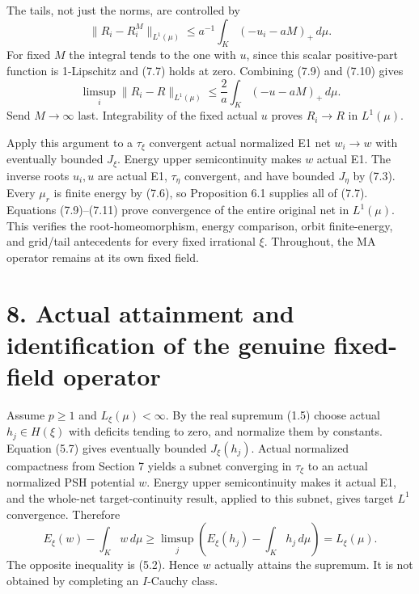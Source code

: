 \documentclass[
  10pt,
]{article}
\begin{document}
The tails, not just the norms, are controlled by \[
 \|R_i-R_i^M\|_{L^1(\mu)}
                \leq a^{-1}\int_K(-u_i-aM)_+\,d\mu.            \tag{7.10}
\] For fixed \(M\) the integral tends to the one with \(u\), since this
scalar positive-part function is 1-Lipschitz and (7.7) holds at zero.
Combining (7.9) and (7.10) gives \[
 \limsup_i\|R_i-R\|_{L^1(\mu)}
                     \leq\frac2a\int_K(-u-aM)_+\,d\mu.        \tag{7.11}
\] Send \(M\to\infty\) last. Integrability of the fixed actual \(u\)
proves \(R_i\to R\) in \(L^1(\mu)\).

Apply this argument to a \(\tau_\xi\) convergent actual normalized E1
net \(w_i\to w\) with eventually bounded \(J_\xi\). Energy upper
semicontinuity makes \(w\) actual E1. The inverse roots \(u_i,u\) are
actual E1, \(\tau_\eta\) convergent, and have bounded \(J_\eta\) by
(7.3). Every \(\mu_r\) is finite energy by (7.6), so Proposition 6.1
supplies all of (7.7). Equations (7.9)--(7.11) prove convergence of the
entire original net in \(L^1(\mu)\). This verifies the
root-homeomorphism, energy comparison, orbit finite-energy, and
grid/tail antecedents for every fixed irrational \(\xi\). Throughout,
the MA operator remains at its own fixed field.

\section{8. Actual attainment and identification of the genuine
fixed-field
operator}\label{actual-attainment-and-identification-of-the-genuine-fixed-field-operator}

Assume \(p\geq1\) and \(L_\xi(\mu)<\infty\). By the real supremum (1.5)
choose actual \(h_j\in H(\xi)\) with deficits tending to zero, and
normalize them by constants. Equation (5.7) gives eventually bounded
\(J_\xi(h_j)\). Actual normalized compactness from Section 7 yields a
subnet converging in \(\tau_\xi\) to an actual normalized PSH potential
\(w\). Energy upper semicontinuity makes it actual E1, and the whole-net
target-continuity result, applied to this subnet, gives target \(L^1\)
convergence. Therefore \[
 E_\xi(w)-\int_Kw\,d\mu
 \geq\limsup_j\left(E_\xi(h_j)-\int_Kh_j\,d\mu\right)
                      =L_\xi(\mu).                            \tag{8.1}
\] The opposite inequality is (5.2). Hence \(w\) actually attains the
supremum. It is not obtained by completing an \(I\)-Cauchy class.
\end{document}
